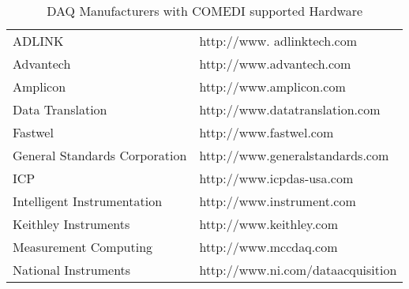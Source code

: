 \vspace{1cm}
\begin{table}[htdp]
\caption{DAQ Manufacturers with COMEDI supported Hardware}
\label{DAQs}
\begin{center}
\vspace{.5cm}
\begin{tabular}{ll}
ADLINK & http://www. adlinktech.com\\
Advantech & http://www.advantech.com\\
Amplicon & http://www.amplicon.com\\
Data Translation & http://www.datatranslation.com\\
Fastwel & http://www.fastwel.com\\
General Standards Corporation & http://www.generalstandards.com\\
ICP & http://www.icpdas-usa.com\\
Intelligent Instrumentation & http://www.instrument.com\\
Keithley Instruments & http://www.keithley.com\\
Measurement Computing & http://www.mccdaq.com\\
National Instruments & http://www.ni.com/dataacquisition\\
\end{tabular}
\end{center}
\end{table}
\vspace{1cm}


